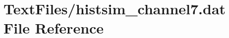 \hypertarget{TextFiles_2histsim__channel7_8dat}{}\section{Text\+Files/histsim\+\_\+channel7.dat File Reference}
\label{TextFiles_2histsim__channel7_8dat}
